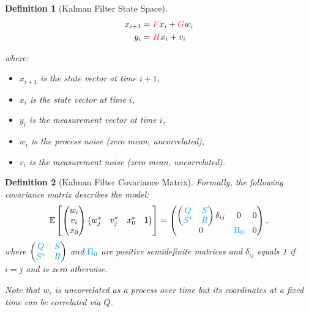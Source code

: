 \documentclass[a4 paper]{article}
\numberwithin{equation}{section}
\theoremstyle{boldStyle}
\theoremstyle{boldBlueStyle}
\theoremstyle{boldPurpleStyle}
\theoremstyle{boldRedStyle}
\newtheorem{definition}{Definition}[section]
\theoremstyle{boldGreenStyle}
\begin{document}
\begin{definition}[Kalman Filter State Space] 
  \begin{equation}
    \begin{aligned}
      x_{i+1} &= \tred{F} x_i + \tred{G} w_i \\
      y_i &= \tred{H} x_i + v_i
    \end{aligned}
  \end{equation}

  where:
\begin{itemize}
    \item \( x_{i+1} \) is the state vector at time \( i+1 \),
    \item \( x_i \) is the state vector at time \( i \),
    \item \( y_i \) is the measurement vector at time \( i \),
    \item \( w_i \) is the process noise (zero mean, uncorrelated),
    \item \( v_i \) is the measurement noise (zero mean, uncorrelated).
\end{itemize}
\end{definition}


\begin{definition}[Kalman Filter Covariance Matrix] 
  Formally, the following covariance matrix describes the model:
  \begin{equation}
      \mathbb{E} \left[
      \begin{pmatrix}
          w_i \\
          v_i \\
          x_0
      \end{pmatrix}
      \begin{pmatrix}
          w_j^* & v_j^* & x_0^* & 1
      \end{pmatrix}
      \right] = 
      \begin{pmatrix}
          \begin{pmatrix}
            \tblu{Q} & \tblu{S} \\
            \tblu{S^*} & \tblu{R}
          \end{pmatrix} \delta_{ij} & 0 & 0 \\
          0 & \tblu{\Pi_0} & 0
      \end{pmatrix},
      \label{eq:covariance_matrix}
  \end{equation}
  where \(
    \begin{pmatrix}
      \tblu{Q} & \tblu{S} \\
      \tblu{S^*} & \tblu{R}
    \end{pmatrix}
  \) and \(\tblu{\Pi_0}\) are positive semidefinite matrices and \(\delta_{ij}\) equals 1 if \(i = j\) and is zero otherwise.
  
  Note that \(w_i\) is uncorrelated as a process over time but its coordinates at a fixed time can be correlated via \(Q\).
\end{definition}
\end{document}
